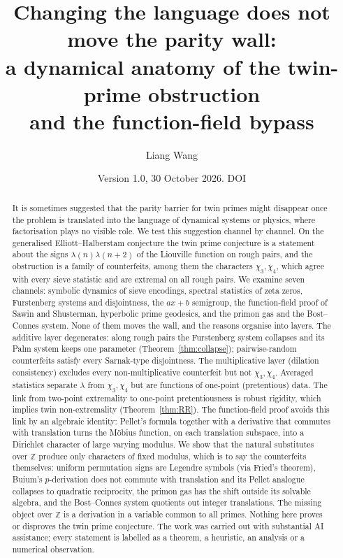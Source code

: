\documentclass[11pt]{amsart}
\title[A dynamical anatomy of the twin-prime parity wall]{Changing the language does not move the parity wall:\\ a dynamical anatomy of the twin-prime obstruction\\ and the function-field bypass}
\author{Liang Wang}
\date{Version 1.0, 30 October 2026. DOI \href{https://doi.org/\DOI}{\DOI}}
\theoremstyle{definition}
\theoremstyle{remark}
\newcommand{\Z}{\mathbb{Z}}
\begin{document}
\begin{abstract}
It is sometimes suggested that the parity barrier for twin primes might disappear once the problem is translated into the language of dynamical systems or physics, where factorisation plays no visible role. We test this suggestion channel by channel. On the generalised Elliott--Halberstam conjecture the twin prime conjecture is a statement about the signs $\lambda(n)\lambda(n+2)$ of the Liouville function on rough pairs, and the obstruction is a family of counterfeits, among them the characters $\chi_3,\chi_4$, which agree with every sieve statistic and are extremal on all rough pairs. We examine seven channels: symbolic dynamics of sieve encodings, spectral statistics of zeta zeros, Furstenberg systems and disjointness, the $ax+b$ semigroup, the function-field proof of Sawin and Shusterman, hyperbolic prime geodesics, and the primon gas and the Bost--Connes system.
None of them moves the wall, and the reasons organise into layers. The additive layer degenerates: along rough pairs the Furstenberg system collapses and its Palm system keeps one parameter (Theorem~\ref{thm:collapse}); pairwise-random counterfeits satisfy every Sarnak-type disjointness. The multiplicative layer (dilation consistency) excludes every non-multiplicative counterfeit but not $\chi_3,\chi_4$. Averaged statistics separate $\lambda$ from $\chi_3,\chi_4$ but are functions of one-point (pretentious) data. The link from two-point extremality to one-point pretentiousness is robust rigidity, which implies twin non-extremality (Theorem~\ref{thm:RR}).
The function-field proof avoids this link by an algebraic identity: Pellet's formula together with a derivative that commutes with translation turns the Möbius function, on each translation subspace, into a Dirichlet character of large varying modulus. We show that the natural substitutes over $\Z$ produce only characters of fixed modulus, which is to say the counterfeits themselves: uniform permutation signs are Legendre symbols (via Fried's theorem), Buium's $p$-derivation does not commute with translation and its Pellet analogue collapses to quadratic reciprocity, the primon gas has the shift outside its solvable algebra, and the Bost--Connes system quotients out integer translations.
The missing object over $\Z$ is a derivation in a variable common to all primes. Nothing here proves or disproves the twin prime conjecture. The work was carried out with substantial AI assistance; every statement is labelled as a theorem, a heuristic, an analysis or a numerical observation.
\end{abstract}
\maketitle
\end{document}
